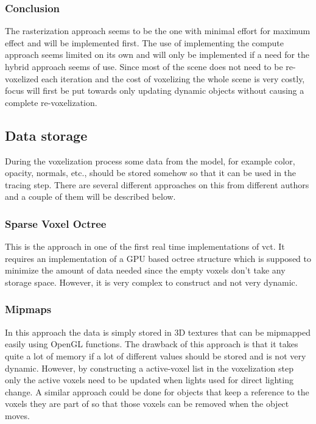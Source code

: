 \documentclass[a4paper, 12pt]{article}
\begin{document}
\subsubsection{Conclusion}

The rasterization approach seems to be the one with minimal effort for maximum effect and will be implemented first. The use of implementing the compute approach seems limited on its own and will only be implemented if a need for the hybrid approach seems of use. Since most of the scene does not need to be re-voxelized each iteration and the cost of voxelizing the whole scene is very costly, focus will first be put towards only updating dynamic objects without causing a complete re-voxelization.

\subsection{Data storage}

During the voxelization process some data from the model, for example color, opacity, normals, etc., should be stored somehow so that it can be used in the tracing step. There are several different approaches on this from different authors and a couple of them will be described below.

\subsubsection{Sparse Voxel Octree}

This is the approach in one of the first real time implementations of \gls{vct}. It requires an implementation of a GPU based octree structure which is supposed to minimize the amount of data needed since the empty voxels don't take any storage space. However, it is very complex to construct and not very dynamic.

\subsubsection{Mipmaps}

In this approach the data is simply stored in 3D textures that can be mipmapped easily using OpenGL functions. The drawback of this approach is that it takes quite a lot of memory if a lot of different values should be stored and is not very dynamic. However, by constructing a active-voxel list in the voxelization step only the active voxels need to be updated when lights used for direct lighting change. A similar approach could be done for objects that keep a reference to the voxels they are part of so that those voxels can be removed when the object moves.
\end{document}
